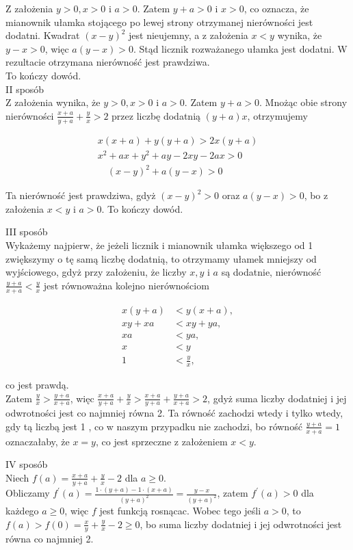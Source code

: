 \documentclass[10pt]{article}
\begin{document}
Z założenia $y>0, x>0$ i $a>0$. Zatem $y+a>0$ i $x>0$, co oznacza, że mianownik ułamka stojącego po lewej strony otrzymanej nierówności jest dodatni. Kwadrat $(x-y)^{2}$ jest nieujemny, a z założenia $x<y$ wynika, że $y-x>0$, więc $a(y-x)>0$. Stąd licznik rozważanego ułamka jest dodatni. W rezultacie otrzymana nierówność jest prawdziwa.\\
To kończy dowód.\\
II sposób\\
Z założenia wynika, że $y>0, x>0$ i $a>0$. Zatem $y+a>0$. Mnożąc obie strony nierówności $\frac{x+a}{y+a}+\frac{y}{x}>2$ przez liczbę dodatnią $(y+a) x$, otrzymujemy

$$
\begin{gathered}
x(x+a)+y(y+a)>2 x(y+a) \\
x^{2}+a x+y^{2}+a y-2 x y-2 a x>0 \\
\quad(x-y)^{2}+a(y-x)>0
\end{gathered}
$$

Ta nierówność jest prawdziwa, gdyż $(x-y)^{2}>0$ oraz $a(y-x)>0$, bo z założenia $x<y$ i $a>0$. To kończy dowód.

III sposób\\
Wykażemy najpierw, że jeżeli licznik i mianownik ułamka większego od 1 zwiększymy o tę samą liczbę dodatnią, to otrzymamy ułamek mniejszy od wyjściowego, gdyż przy założeniu, że liczby $x, y$ i $a$ są dodatnie, nierówność $\frac{y+a}{x+a}<\frac{y}{x}$ jest równoważna kolejno nierównościom

$$
\begin{aligned}
x(y+a) & <y(x+a), \\
x y+x a & <x y+y a, \\
x a & <y a, \\
x & <y \\
1 & <\frac{y}{x},
\end{aligned}
$$

co jest prawdą.\\
Zatem $\frac{y}{x}>\frac{y+a}{x+a}$, więc $\frac{x+a}{y+a}+\frac{y}{x}>\frac{x+a}{y+a}+\frac{y+a}{x+a}>2$, gdyż suma liczby dodatniej i jej odwrotności jest co najmniej równa 2. Ta równość zachodzi wtedy i tylko wtedy, gdy tą liczbą jest 1 , co w naszym przypadku nie zachodzi, bo równość $\frac{y+a}{x+a}=1$ oznaczałaby, że $x=y$, co jest sprzeczne z założeniem $x<y$.

IV sposób\\
Niech $f(a)=\frac{x+a}{y+a}+\frac{y}{x}-2$ dla $a \geq 0$.\\
Obliczamy $f^{\prime}(a)=\frac{1 \cdot(y+a)-1 \cdot(x+a)}{(y+a)^{2}}=\frac{y-x}{(y+a)^{2}}$, zatem $f^{\prime}(a)>0$ dla każdego $a \geq 0$, więc $f$ jest funkcją rosnącac. Wobec tego jeśli $a>0$, to $f(a)>f(0)=\frac{x}{y}+\frac{y}{x}-2 \geq 0$, bo suma liczby dodatniej i jej odwrotności jest równa co najmniej 2.
\end{document}
